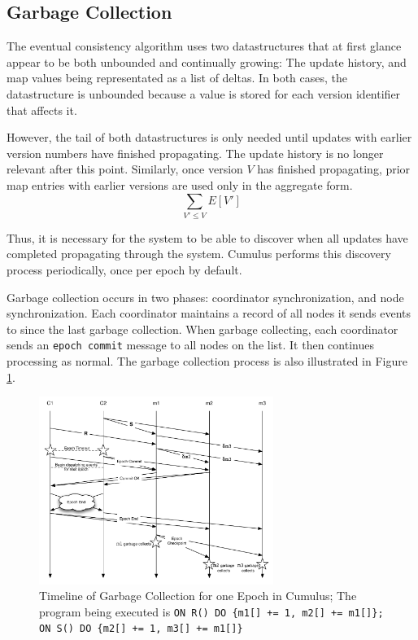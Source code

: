 \documentclass{vldb}
\begin{document}
\subsection{Garbage Collection}
The eventual consistency algorithm uses two datastructures that at first glance appear to be both unbounded and continually growing: The update history, and map values being representated as a list of deltas.  In both cases, the datastructure is unbounded because a value is stored for each version identifier that affects it. 

However, the tail of both datastructures is only needed until updates with earlier version numbers have finished propagating.  The update history is no longer relevant after this point.  Similarly, once version $V$ has finished propagating, prior map entries with earlier versions are used only in the aggregate form.
$$\sum_{V' \leq V} E[V']$$

Thus, it is necessary for the system to be able to discover when all updates have completed propagating through the system.  Cumulus performs this discovery process periodically, once per epoch by default.  


Garbage collection occurs in two phases: coordinator synchronization, and node synchronization.  Each coordinator maintains a record of all nodes it sends events to since the last garbage collection.  When garbage collecting, each coordinator sends an \texttt{epoch commit} message to all nodes on the list.  It then continues processing as normal.  The garbage collection process is also illustrated in Figure \ref{fig:GCflowchart}.

\begin{figure}
\begin{center}
\includegraphics[width=3in]{graphics/GCflowchart}
\caption{Timeline of Garbage Collection for one Epoch in Cumulus; The program being executed is \texttt{ON R() DO \{m1[] += 1, m2[] += m1[]\}; ON S() DO \{m2[] += 1, m3[] += m1[]\}} }
\label{fig:GCflowchart}
\end{center}

\end{figure}
\end{document}
